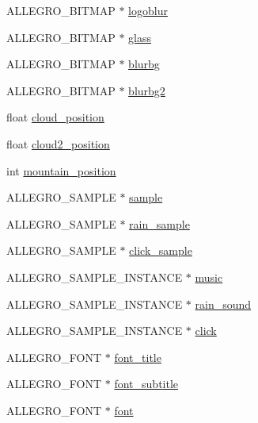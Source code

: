 \begin{DoxyCompactItemize}
A\-L\-L\-E\-G\-R\-O\-\_\-\-B\-I\-T\-M\-A\-P $\ast$ \hyperlink{structMenu_a5f788b05a06fb2322c790e178c34bad6}{logoblur}
\item 
A\-L\-L\-E\-G\-R\-O\-\_\-\-B\-I\-T\-M\-A\-P $\ast$ \hyperlink{structMenu_ad9d4472398e580ffb12c7d7773e8cab8}{glass}
\item 
A\-L\-L\-E\-G\-R\-O\-\_\-\-B\-I\-T\-M\-A\-P $\ast$ \hyperlink{structMenu_ac5a4b29925ad8348687309b38ad37081}{blurbg}
\item 
A\-L\-L\-E\-G\-R\-O\-\_\-\-B\-I\-T\-M\-A\-P $\ast$ \hyperlink{structMenu_acf060e754cd17ee89d5164043058dbb7}{blurbg2}
\item 
float \hyperlink{structMenu_a0e6c60743147ff2ead1e0bb2f89d0036}{cloud\-\_\-position}
\item 
float \hyperlink{structMenu_a143c3675204c7cf1381decbfe4be5476}{cloud2\-\_\-position}
\item 
int \hyperlink{structMenu_a10770a9453a92c77d64c7fdb0e34e725}{mountain\-\_\-position}
\item 
A\-L\-L\-E\-G\-R\-O\-\_\-\-S\-A\-M\-P\-L\-E $\ast$ \hyperlink{structMenu_a19a25811d2d08b8fa1d1819088168b72}{sample}
\item 
A\-L\-L\-E\-G\-R\-O\-\_\-\-S\-A\-M\-P\-L\-E $\ast$ \hyperlink{structMenu_ad14705d9172d76dc241de8f4657254cc}{rain\-\_\-sample}
\item 
A\-L\-L\-E\-G\-R\-O\-\_\-\-S\-A\-M\-P\-L\-E $\ast$ \hyperlink{structMenu_a012f284df5f9d8e39785a264c736c506}{click\-\_\-sample}
\item 
A\-L\-L\-E\-G\-R\-O\-\_\-\-S\-A\-M\-P\-L\-E\-\_\-\-I\-N\-S\-T\-A\-N\-C\-E $\ast$ \hyperlink{structMenu_a7b8c42bd64118eb18dceafbd9ac8b3d5}{music}
\item 
A\-L\-L\-E\-G\-R\-O\-\_\-\-S\-A\-M\-P\-L\-E\-\_\-\-I\-N\-S\-T\-A\-N\-C\-E $\ast$ \hyperlink{structMenu_a31b58f4005206ba8ecc4b6f40223295f}{rain\-\_\-sound}
\item 
A\-L\-L\-E\-G\-R\-O\-\_\-\-S\-A\-M\-P\-L\-E\-\_\-\-I\-N\-S\-T\-A\-N\-C\-E $\ast$ \hyperlink{structMenu_a8f8e8b511a64f03e71259dde1a7bf6f2}{click}
\item 
A\-L\-L\-E\-G\-R\-O\-\_\-\-F\-O\-N\-T $\ast$ \hyperlink{structMenu_aac0297cac51099ec75020a510a6dcbb3}{font\-\_\-title}
\item 
A\-L\-L\-E\-G\-R\-O\-\_\-\-F\-O\-N\-T $\ast$ \hyperlink{structMenu_a18d7377e798bac336e55e253243d4e13}{font\-\_\-subtitle}
\item 
A\-L\-L\-E\-G\-R\-O\-\_\-\-F\-O\-N\-T $\ast$ \hyperlink{structMenu_aa4e0229cb315ef9e0ea90263b26a37f8}{font}
\item 

\end{DoxyCompactItemize}
